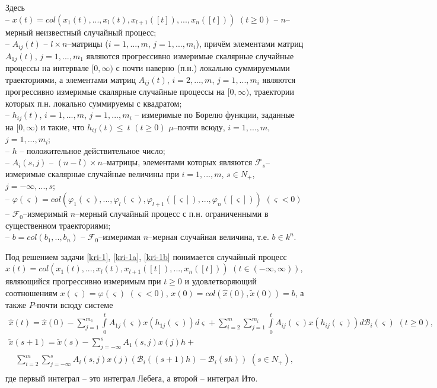 Здесь\\
\noindent
  -- $x(t) = col (x_1(t), ..., x_l(t), x_{l+1}([t]), ...,
x_n([t]))$ $ (t \ge 0)$  -- $n$--мерный неизвестный случайный
процесс;\\
  -- $A_{ij}(t)$ -- $l \times n$--матрицы ($i = 1,...,m$, $j =
1,...,m_i$), причём элементами матриц $A_{1j}(t)$, $j = 1,...,m_1$
являются прогрессивно измеримые скалярные случайные процессы на
интервале $[0, \infty)$ с почти наверно (п.н.) локально суммируемыми
траекториями, а элементами матриц $A_{ij}(t)$, $i = 2,...,m$, $j =
1,...,m_i$ являются прогрессивно измеримые скалярные случайные
процессы на $[0, \infty)$, траектории которых п.н. локально
суммируемы с квадратом;\\
  -- $ h_{ij}(t)$, $i = 1,...,m$, $j = 1,...,m_i$ -- измеримые по
Борелю функции, заданные на $[0, \infty)$ и такие, что $h_{ij}(t)
\leq \ t {\,} {\,} (t \geq 0)$ $\mu $--почти всюду, $i = 1,...,m$,
$j = 1,...,m_i$;\\
  -- $h$ -- положительное действительное число;\\
  -- $A_i(s,j)$ -- $(n-l)\times n$--матрицы, элементами которых являются
${\mathcal F}_s$--измеримые скалярные случайные величины при
$i=1,...,m$, $s\in N_+$, $j=-\infty ,...,s$;\\
  -- $\varphi (\varsigma ) = col (\varphi _1 (\varsigma),..., \varphi
_l (\varsigma), \varphi _{l+1} ([\varsigma]), ..., \varphi _n
([\varsigma])) \, \, (\varsigma < 0)$ -- ${\mathcal F}_0$--измеримый
$n$--мерный случайный процесс с п.н. ограниченными в существенном
траекториями;\\
  -- $b = col (b_1,.., b_n)$ -- ${\mathcal F}_0$--измеримая
$n$--мерная случайная величина, т.е. $b \in k^n$.


\begin{definition}\label{kri-def1} Под решением задачи \eqref{kri-1}, \eqref{kri-1a}, \eqref{kri-1b}
понимается случайный процесс $x(t) = col (x_1(t), ..., x_l(t),
x_{l+1}([t]), ..., x_n([t]))\, \,(t \in (-\infty , \infty))$,
являющийся прогрессивно измеримым при  $t \ge 0$ и удовлетворяющий
соотношениям $x(\varsigma)=\varphi (\varsigma)\,\, (\varsigma < 0)$,
$x(0) = col (\hat x(0), \tilde x(0)) = b$, а также $P$-почти всюду
системе
$$
\begin {array}{crl}
 \hat x(t) =  \hat x(0)- \sum
 \limits_{j=1}^{m_1}\int \limits _0^tA_{1j}(\varsigma)x(h_{1j}(\varsigma))d\varsigma +
 \sum \limits_{i=2}^m\sum \limits_{j=1}^{m_i}
 \int \limits _0^t A_{ij}(\varsigma)x(h_{ij}(\varsigma))d\mathcal B_i(\varsigma) \,\, (t \ge
 0),\\
 \tilde x(s+1) = \tilde x(s) - \sum \limits _{j=-\infty }^{s}
A_{1}(s,j)x(j)h +
\end {array}
$$
$$
\begin {array}{crl}
\sum \limits _{i=2}^{m}\sum \limits _{j=-\infty }^{s}
A_{i}(s,j)x(j)(\mathcal B_i((s+1)h) - \mathcal B_i(sh)) \,\, (s
\in N_+),\\
\end {array}
$$
где первый интеграл -- это интеграл Лебега, а второй -- интеграл
Ито.
\end{definition}

